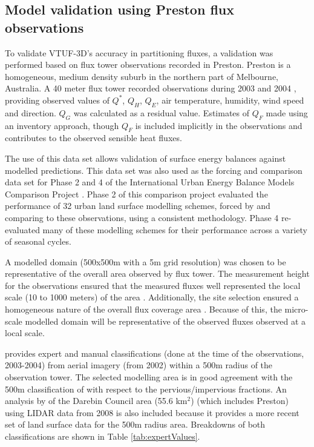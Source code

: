 \documentclass[final,3p,times,authoryear]{elsarticle}
\begin{document}
\subsection{Model validation using Preston flux observations}\label{sec:PrestonValidations}


To validate VTUF-3D's accuracy in partitioning fluxes, a validation was performed based on flux tower observations recorded in Preston. Preston is a homogeneous, medium density suburb in the northern part of Melbourne, Australia. A 40 meter flux tower recorded observations during 2003 and 2004 \citep{Coutts2007}, providing observed values of $Q^{*}$, $Q_{H}$, $Q_{E}$, air temperature, humidity, wind speed and direction. $Q_{G}$ was calculated as a residual value. Estimates of $Q_{F}$ made using an inventory approach, though $Q_{F}$ is included implicitly in the observations and contributes to the observed sensible heat fluxes. 


The use of this data set allows validation of surface energy balances against modelled predictions. This data set was also used as the forcing and comparison data set for Phase 2 and 4 of the International Urban Energy Balance Models Comparison Project \citep{Grimmond2011,Best2012}. Phase 2 of this comparison project evaluated the performance of 32 urban land surface modelling schemes, forced by and comparing to these observations, using a consistent methodology. Phase 4 re-evaluated many of these modelling schemes for their performance across a variety of seasonal cycles.

A modelled domain (500x500m with a 5m grid resolution) was chosen to be representative of the overall area observed by flux tower. The measurement height for the observations ensured that the measured fluxes well represented the local scale (10 to 1000 meters) of the area \citep{Coutts2007}. Additionally, the site selection ensured a homogeneous nature of the overall flux coverage area \citep{Schmid1994}. Because of this, the micro-scale modelled domain will be representative of the observed fluxes observed at a local scale. 


\cite{Coutts2007} provides expert and manual classifications (done at the time of the observations, 2003-2004) from aerial imagery (from 2002) within a 500m radius of the observation tower. The selected modelling area is in good agreement with the 500m classification of \cite{Coutts2007} with respect to the pervious/impervious fractions. An analysis by \cite{Nury2015} of the Darebin Council area (55.6 km$^{2}$) (which includes Preston) using LIDAR data from 2008 is also included because it provides a more recent set of land surface data for the 500m radius area. Breakdowns of both classifications are shown in Table \ref{tab:expertValues}.
\end{document}
